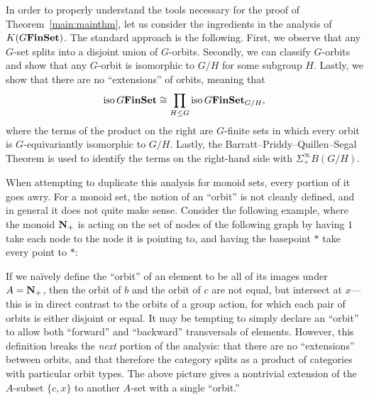 \documentclass[11pt]{amsart}
\begin{document}
In order to properly understand the tools necessary for the proof of Theorem~\ref{main:mainthm}, let us consider the ingredients in the analysis of $K(G\mathbf{FinSet})$.  The standard approach is the following.  First, we observe that any $G$-set splits into a disjoint union of $G$-orbits.  Secondly, we can classify $G$-orbits and show that any $G$-orbit is isomorphic to $G/H$ for some subgroup $H$.  Lastly, we show that there are no ``extensions'' of orbits, meaning that 
\[\mathrm{iso}\, G\mathbf{FinSet} \cong \prod_{H \leq G} \mathrm{iso}\, G\mathbf{FinSet}_{G/H},\]
where the terms of the product on the right are $G$-finite sets in which every orbit is $G$-equivariantly isomorphic to $G/H$.  Lastly, the Barratt--Priddy--Quillen--Segal Theorem is used to identify the terms on the right-hand side with $\Sigma^\infty_+ B(G/H)$.

When attempting to duplicate this analysis for monoid sets, every portion of it goes awry.   For a monoid set, the notion of an ``orbit'' is not cleanly defined, and in general it does not quite make sense.  Consider the following example, where the monoid $\mathbf{N}_+$ is acting on the set of nodes of the following graph by having $1$ take each node to the node it is pointing to, and having the basepoint $*$ take every point to $*$:
\begin{center}
\end{center}  If we na\"ively define the ``orbit'' of an element to be all of its images under $A=\mathbf{N}_+$, then the orbit of $b$ and the orbit of $c$ are not equal, but intersect at $x$---this is in direct contrast to the orbits of a group action, for which each pair of orbits is either disjoint or equal.  It may be tempting to simply declare an ``orbit'' to allow both ``forward'' and ``backward'' transversals of elements.  However, this definition breaks the \emph{next} portion of the analysis: that there are no ``extensions'' between orbits, and that therefore the category splits as a product of categories with particular orbit types.  The above picture gives a nontrivial extension of the $A$-subset $\{c,x\}$ to another $A$-set with a single ``orbit.'' 
\end{document}
